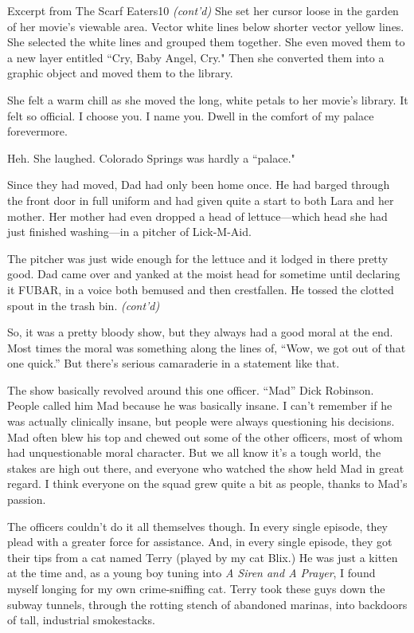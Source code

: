 \documentclass[10pt,twoside]{report}
\begin{document}
	\begin{sidebar}{Excerpt from The Scarf Eaters}{10}
		\textit{(cont'd)} She set her cursor loose in the garden of her movie's viewable area. Vector white lines below shorter vector yellow lines. She selected the white lines and grouped them together. She even moved them to a new layer entitled ``Cry, Baby Angel, Cry." Then she converted them into a graphic object and moved them to the library.\vspace{6pt}
		
		She felt a warm chill as she moved the long, white petals to her movie's library. It felt so official. I choose you. I name you. Dwell in the comfort of my palace forevermore.\vspace{6pt}

		Heh. She laughed. Colorado Springs was hardly a ``palace."\vspace{6pt}

		Since they had moved, Dad had only been home once. He had barged through the front door in full uniform and had given quite a start to both Lara and her mother. Her mother had even dropped a head of lettuce—which head she had just finished washing—in a pitcher of Lick-M-Aid.\vspace{6pt}
		
		The pitcher was just wide enough for the lettuce and it lodged in there pretty good. Dad came over and yanked at the moist head for sometime until declaring it FUBAR, in a voice both bemused and then crestfallen. He tossed the clotted spout in the trash bin. \textit{(cont'd)}
	\end{sidebar}
	
So, it was a pretty bloody show, but they always had a good moral at
the end.  Most times the moral was something along the lines of,
``Wow, we got out of that one quick.''  But there's serious
camaraderie in a statement like that.

The show basically revolved around this one officer.  ``Mad'' Dick
Robinson.  People called him Mad because he was basically insane.  I
can't remember if he was actually clinically insane, but people were
always questioning his decisions.  Mad often blew his top and chewed
out some of the other officers, most of whom had unquestionable moral
character.  But we all know it's a tough world, the stakes are high
out there, and everyone who watched the show held Mad in great regard.
I think everyone on the squad grew quite a bit as people, thanks to
Mad's passion.

The officers couldn't do it all themselves though.  In every single
episode, they plead with a greater force for assistance.  And, in
every single episode, they got their tips from a cat named Terry
(played by my cat Blix.)  He was just a kitten at the time and, as a
young boy tuning into {\em A Siren and A Prayer}, I found myself
longing for my own crime-sniffing cat. Terry took these guys down the
subway tunnels, through the rotting stench of abandoned marinas, into
backdoors of tall, industrial smokestacks.
\end{document}
